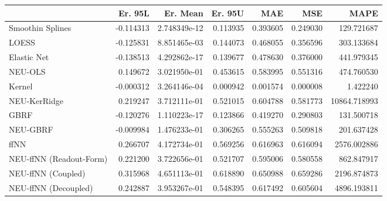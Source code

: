 \begin{tabular}{lrrrrrr}
\toprule
{} &   Er. 95L &      Er. Mean &   Er. 95U &       MAE &       MSE &          MAPE \\
\midrule
Smoothin Splines        & -0.114313 &  2.748349e-12 &  0.113935 &  0.393605 &  0.249030 &    129.721687 \\
LOESS                   & -0.125831 &  8.851465e-03 &  0.144073 &  0.468055 &  0.356596 &    303.133684 \\
Elastic Net             & -0.138513 &  4.292862e-17 &  0.139677 &  0.478630 &  0.376000 &    441.979345 \\
NEU-OLS                 &  0.149672 &  3.021950e-01 &  0.453615 &  0.583995 &  0.551316 &    474.760530 \\
Kernel                  & -0.000312 &  3.264146e-04 &  0.000942 &  0.001574 &  0.000008 &      1.422240 \\
NEU-KerRidge            &  0.219247 &  3.712111e-01 &  0.521015 &  0.604788 &  0.581773 &  10864.718993 \\
GBRF                    & -0.120276 &  1.110223e-17 &  0.123866 &  0.419270 &  0.290803 &    131.500718 \\
NEU-GBRF                & -0.009984 &  1.476233e-01 &  0.306265 &  0.555263 &  0.509818 &    201.637428 \\
ffNN                    &  0.266707 &  4.172734e-01 &  0.569256 &  0.616963 &  0.616094 &   2576.002886 \\
NEU-ffNN (Readout-Form) &  0.221200 &  3.722656e-01 &  0.521707 &  0.595006 &  0.580558 &    862.847917 \\
NEU-ffNN (Coupled)      &  0.315968 &  4.651113e-01 &  0.618890 &  0.650988 &  0.659286 &   2196.874873 \\
NEU-ffNN (Decoupled)    &  0.242887 &  3.953267e-01 &  0.548395 &  0.617492 &  0.605604 &   4896.193811 \\
\bottomrule
\end{tabular}
